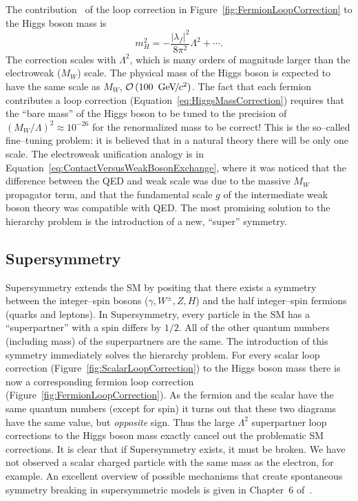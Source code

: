 The contribution~\cite{Martin:1997um}  of the loop correction in
Figure~\ref{fig:FermionLoopCorrection} to the Higgs boson mass is
\begin{equation}
  m^2_H = -\frac{|\lambda_f|^2}{8 \pi^2} \Lambda^2 + \cdots.
  \label{eq:HiggsMassCorrection}
\end{equation}
The correction scales with $\Lambda^2$, which is many orders of magnitude larger
than the electroweak ($M_W$) scale.  The physical mass of the Higgs boson is expected
to have the same scale as $M_W$, $\mbox{\ensuremath{\mathcal{O}\left(100~{\,\text{Ge\hspace{-.08em}V\hspace{-0.16em}/\hspace{-0.08em}}c^\text{2}}\right)}}$.  The fact that each fermion
contributes a loop correction (Equation~\ref{eq:HiggsMassCorrection}) requires
that the ``bare mass'' of the Higgs boson to be tuned to the precision of
$(M_W/\Lambda)^2 \approx 10^{-26}$ for the renormalized mass to be correct!
This is the so--called fine--tuning problem: it is believed that in a natural
theory there will be only one scale.  The electroweak unification analogy is in
Equation~\ref{eq:ContactVersusWeakBosonExchange}, where it was noticed that the
difference between the QED and weak scale was due to the massive $M_W$
propagator term, and that the fundamental scale $g$ of the intermediate weak
boson theory was compatible with QED\@.  The most promising solution to the
hierarchy problem is the introduction of a new, ``super'' symmetry.

\subsection{Supersymmetry}
Supersymmetry extends the SM by positing that there exists a
symmetry between the integer--spin bosons ($\gamma, W^\pm, Z, H$) and the half
integer--spin fermions (quarks and leptons).  In Supersymmetry, every particle
in the SM has a ``superpartner'' with a spin differs by $1/2$.  All
of the other quantum numbers (including mass) of the superpartners are the same.
The introduction of this symmetry immediately solves the hierarchy problem.  For
every scalar loop correction (Figure~\ref{fig:ScalarLoopCorrection}) to the
Higgs boson mass there is now a corresponding fermion loop correction
(Figure~\ref{fig:FermionLoopCorrection}).  As the fermion and the scalar have
the same quantum numbers (except for spin) it turns out that these two diagrams
have the same value, but \emph{opposite} sign.  Thus the large $\Lambda^2$
superpartner loop corrections to the Higgs boson mass exactly cancel out the
problematic SM corrections.  It is clear that if Supersymmetry
exists, it must be broken.  We have not observed a scalar charged particle with
the same mass as the electron, for example.  An excellent overview of possible
mechanisms that create spontaneous symmetry breaking in supersymmetric models is
given in Chapter~6 of~\cite{Martin:1997um}.

